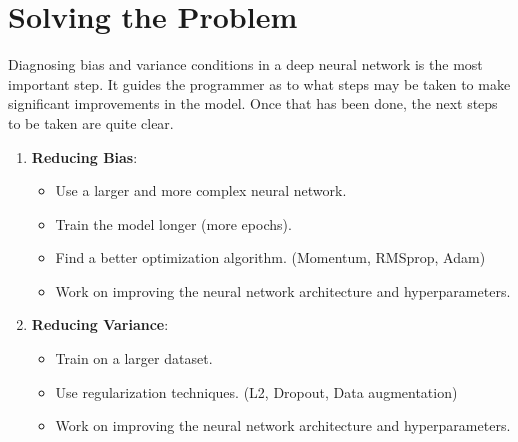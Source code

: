 \documentclass[a4paper, 12pt]{report}
\begin{document}
\section{Solving the Problem}
Diagnosing bias and variance conditions in a deep neural network is the most important step. It guides the programmer as to what steps may be taken to make significant improvements in the model. Once that has been done, the next steps to be taken are quite clear.
\begin{enumerate}
\item \textbf{Reducing Bias}:
\begin{itemize}
\item Use a larger and more complex neural network.
\item Train the model longer (more epochs).
\item Find a better optimization algorithm. (Momentum, RMSprop, Adam)
\item Work on improving the neural network architecture and hyperparameters.
\end{itemize}
\item \textbf{Reducing Variance}:
\begin{itemize}
\item Train on a larger dataset.
\item Use regularization techniques. (L2, Dropout, Data augmentation)
\item Work on improving the neural network architecture and hyperparameters.
\end{itemize}
\end{enumerate}
\end{document}
